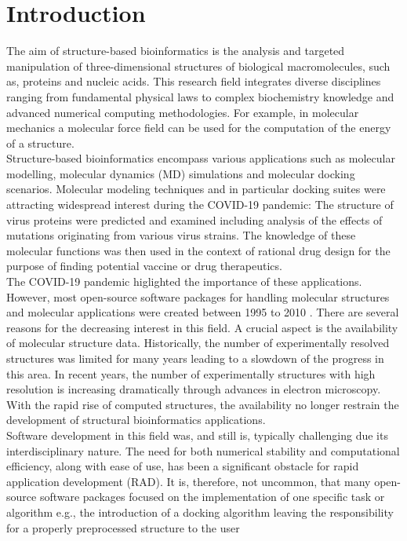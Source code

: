 \section{Introduction}


The aim of structure-based bioinformatics is the analysis and targeted manipulation of three-dimensional structures of biological macromolecules, such as, proteins and nucleic acids. This research field integrates diverse disciplines ranging from fundamental physical laws to complex biochemistry knowledge and advanced numerical computing methodologies. For example, in molecular mechanics a molecular force field can be used for the computation of the energy of a structure.  \\
Structure-based bioinformatics encompass various applications such as molecular modelling, molecular dynamics (MD) simulations and molecular docking scenarios.  Molecular modeling techniques and in particular docking suites were attracting widespread interest during the COVID-19 pandemic: The structure of virus proteins were predicted and examined including analysis of the effects of mutations originating from various virus strains. The knowledge of these molecular functions was then used in the context of rational drug design for the purpose of finding potential vaccine or drug therapeutics\cite{Kumar2021}. \\
The COVID-19 pandemic higlighted the importance of these applications. However, most open-source software packages for handling molecular structures and molecular applications were created between 1995 to 2010 . There are several reasons for the decreasing interest in this field. A crucial aspect is the availability of molecular structure data. Historically, the number of experimentally resolved structures was limited for many years leading to a slowdown of the progress in this area. In recent years, the number of experimentally structures with high resolution is increasing dramatically through advances in electron microscopy. With the rapid rise of computed structures, the availability no longer restrain the development of structural bioinformatics applications. \\
Software development in this field was, and still is, typically challenging due its interdisciplinary nature. The need for both numerical stability and computational efficiency, along with ease of use, has been a significant obstacle for rapid application development (RAD). 
It is, therefore, not uncommon, that many open-source software packages focused on the implementation of one specific task or algorithm e.g., the introduction of a docking algorithm leaving the responsibility for a properly preprocessed structure to the user  \\
